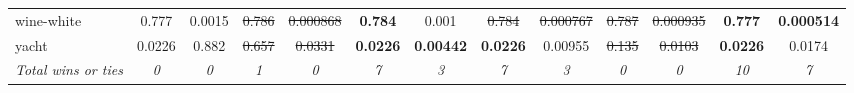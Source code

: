 \begin{tabular}{l|cc|cc|cc|cc|cc|cc}
wine-white & 0.777 & 0.0015 & \sout{0.786} & \sout{0.000868} & \textbf{0.784} & 0.001 & \sout{0.784} & \sout{0.000767} & \sout{0.787} & \sout{0.000935} & \textbf{0.777} & \textbf{0.000514} \\
yacht & 0.0226 & 0.882 & \sout{0.657} & \sout{0.0331} & \textbf{0.0226} & \textbf{0.00442} & \textbf{0.0226} & 0.00955 & \sout{0.135} & \sout{0.0103} & \textbf{0.0226} & 0.0174 \\
\textit{{Total wins or ties}} & \textit{0} & \textit{0} & \textit{1} & \textit{0} & \textit{7} & \textit{3} & \textit{7} & \textit{3} & \textit{0} & \textit{0} & \textit{10} & \textit{7} \\
\bottomrule
\end{tabular}
